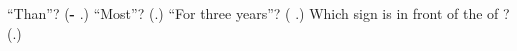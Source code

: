 \begin{tcolorbox}[breakable,colback=teal!4,colframe=teal!35!black,title={Before you move on}]
\textquotedblleft{}Than\textquotedblright{}? (\textbf{- }.) \textquotedblleft{}Most\textquotedblright{}? (\textbf{}.) \textquotedblleft{}For three years\textquotedblright{}? (\textbf{  }.) Which sign is in front of the \textbf{} of \textbf{}? (\textbf{}.)
\end{tcolorbox}
